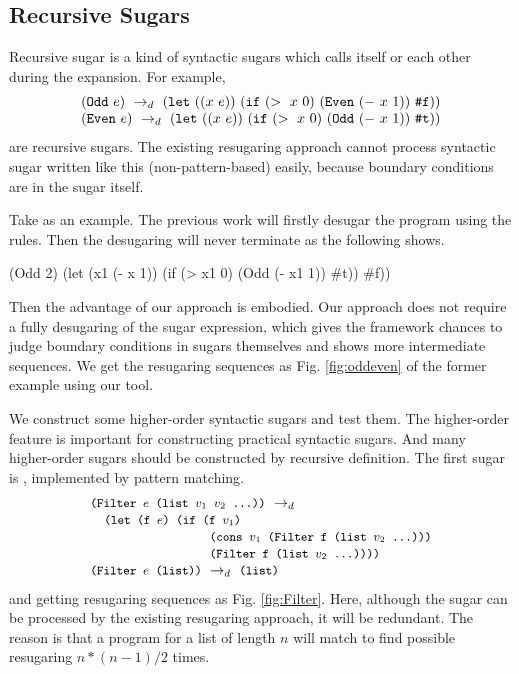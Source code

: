 \subsection{Recursive Sugars}
\label{sec:recursiveSugar}

Recursive sugar is a kind of syntactic sugars which calls itself or each other during the expansion. For example,
\[
\begin{array}{l}
(\mbox{\tt Odd}~e) ~\rightarrow_d~ (\mbox{\tt let}~((x~e))~(\mbox{\tt if}~(>~x~0)~(\mbox{\tt Even}~(-~x~1))~\mbox{\tt \#f}))\\
(\mbox{\tt Even}~e) ~\rightarrow_d~ (\mbox{\tt let}~((x~e))~(\mbox{\tt if}~(>~x~0)~(\mbox{\tt Odd}~(-~x~1))~\mbox{\tt \#t}))
\end{array}
\]
are recursive sugars. The existing resugaring approach cannot process syntactic sugar written like this (non-pattern-based) easily, because boundary conditions are in the sugar itself.

Take  as an example. The previous work will firstly desugar the program using the rules. Then the desugaring will never terminate as the following shows.
\begin{footnotesize}
\begin{Codes}
   (Odd 2)
\qquad\quad(let (x1 (- x 1)) (if (> x1 0) (Odd (- x1 1)) \#t))
\qquad\quad\#f))
\end{Codes}
\end{footnotesize}



Then the advantage of our approach is embodied. Our approach does not require a fully desugaring of the sugar expression, which gives the framework chances to judge boundary conditions in sugars themselves and shows more intermediate sequences. We get the resugaring sequences as Fig.  \ref{fig:oddeven} of the former example using our tool.



We construct some higher-order syntactic sugars and test them. The higher-order feature is important for constructing practical syntactic sugars. And many higher-order sugars should be constructed by recursive definition. The first sugar is , implemented by pattern matching.
\[\begin{array}{l}
\texttt{\small(Filter $e$ (list $v_1$ $v_2$ ...))} ~\rightarrow_d~\\
\quad
\texttt{\small (let (f $e$) (if (f $v_1$)}\\
\qquad\qquad\qquad\qquad\;\;\texttt{\small (cons $v_1$ (Filter f (list $v_2$ ...)))}\\
\qquad\qquad\qquad\qquad\;\;\texttt{\small (Filter f (list $v_2$ ...))))}\\

\texttt{\small(Filter $e$ (list))} ~\rightarrow_d~ \texttt{\small(list)}
\end{array}\]
and getting resugaring sequences as Fig.  \ref{fig:Filter}.
Here, although the sugar can be processed by the existing resugaring approach, it will be redundant. The reason is that a  program for a list of length $n$ will match to find possible resugaring $n*(n-1)/2$ times. 

